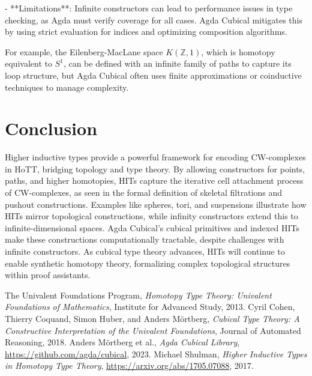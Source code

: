 \documentclass{article}
\theoremstyle{definition}
\begin{document}
- **Limitations**: Infinite constructors can lead to performance issues in type checking, as Agda must verify coverage for all cases. Agda Cubical mitigates this by using strict evaluation for indices and optimizing composition algorithms.

For example, the Eilenberg-MacLane space \( K(\mathbb{Z}, 1) \), which is homotopy equivalent to \( S^1 \), can be defined with an infinite family of paths to capture its loop structure, but Agda Cubical often uses finite approximations or coinductive techniques to manage complexity.

\section{Conclusion}
Higher inductive types provide a powerful framework for encoding CW-complexes in HoTT, bridging topology and type theory. By allowing constructors for points, paths, and higher homotopies, HITs capture the iterative cell attachment process of CW-complexes, as seen in the formal definition of skeletal filtrations and pushout constructions. Examples like spheres, tori, and suspensions illustrate how HITs mirror topological constructions, while infinity constructors extend this to infinite-dimensional spaces. Agda Cubical’s cubical primitives and indexed HITs make these constructions computationally tractable, despite challenges with infinite constructors. As cubical type theory advances, HITs will continue to enable synthetic homotopy theory, formalizing complex topological structures within proof assistants.


\begin{thebibliography}{9}
The Univalent Foundations Program, \emph{Homotopy Type Theory: Univalent Foundations of Mathematics}, Institute for Advanced Study, 2013.
Cyril Cohen, Thierry Coquand, Simon Huber, and Anders Mörtberg, \emph{Cubical Type Theory: A Constructive Interpretation of the Univalent Foundations}, Journal of Automated Reasoning, 2018.
Anders Mörtberg et al., \emph{Agda Cubical Library}, \url{https://github.com/agda/cubical}, 2023.
Michael Shulman, \emph{Higher Inductive Types in Homotopy Type Theory}, \url{https://arxiv.org/abs/1705.07088}, 2017.
\end{thebibliography}
\end{document}
